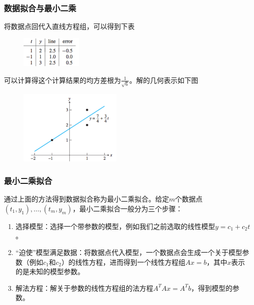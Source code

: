 \documentclass[10pt]{beamer}
\begin{document}
\begin{frame}
\frametitle{数据拟合与最小二乘}
将数据点回代入直线方程组，可以得到下表
\begin{figure}
\includegraphics[width=3cm]{figs/4-1-2_Fitting_Data-2} 
\end{figure}
可以计算得这个计算结果的均方差根为$\frac{1}{\sqrt{6}}$。解的几何表示如下图
\begin{figure}
\includegraphics[width=5cm]{figs/4-1-2_Fitting_Data-3} 
\end{figure}
\end{frame}


\begin{frame}
\frametitle{最小二乘拟合}
通过上面的方法得到数据拟合称为最小二乘拟合。给定$m$个数据点$(t_1, y_1), \ldots, (t_m, y_m)$，最小二乘拟合一般分为三个步骤：

\begin{enumerate}
\item 选择模型：选择一个带参数的模型，例如我们之前选取的线性模型$ y = c_1 + c_2t$。
\item “迫使”模型满足数据：将数据点代入模型，一个数据点会生成一个关于模型参数（例如$c_1$和$c_2$）的线性方程，进而得到一个线性方程组$Ax = b$，其中$x$表示的是未知的模型参数。
\item 解法方程：解关于参数的线性方程组的法方程$A^TAx = A^Tb$，得到模型的参数。
\end{enumerate}
\end{frame}
\end{document}
